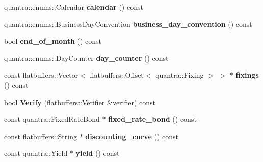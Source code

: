 \begin{DoxyCompactItemize}
quantra\+::enums\+::\+Calendar {\bfseries calendar} () const
\item 
\mbox{\label{structquantra_1_1FLATBUFFERS__FINAL__CLASS_acc1afb278b3cf7c9923940b4704456f9}} 
quantra\+::enums\+::\+Business\+Day\+Convention {\bfseries business\+\_\+day\+\_\+convention} () const
\item 
\mbox{\label{structquantra_1_1FLATBUFFERS__FINAL__CLASS_abdb9fb60303f28fc766fc1ab7c9555d8}} 
bool {\bfseries end\+\_\+of\+\_\+month} () const
\item 
\mbox{\label{structquantra_1_1FLATBUFFERS__FINAL__CLASS_a955b9a33f908db3b82dea98242bc214e}} 
quantra\+::enums\+::\+Day\+Counter {\bfseries day\+\_\+counter} () const
\item 
\mbox{\label{structquantra_1_1FLATBUFFERS__FINAL__CLASS_ac0992a882fdf0e3cc1274853d9350dae}} 
const flatbuffers\+::\+Vector$<$ flatbuffers\+::\+Offset$<$ quantra\+::\+Fixing $>$ $>$ $\ast$ {\bfseries fixings} () const
\item 
\mbox{\label{structquantra_1_1FLATBUFFERS__FINAL__CLASS_aed693ee5a45b5f53af7411f9cab6793a}} 
bool {\bfseries Verify} (flatbuffers\+::\+Verifier \&verifier) const
\item 
\mbox{\label{structquantra_1_1FLATBUFFERS__FINAL__CLASS_a2c68c02ac4d96cdf9b7e24928f4702f1}} 
const quantra\+::\+Fixed\+Rate\+Bond $\ast$ {\bfseries fixed\+\_\+rate\+\_\+bond} () const
\item 
\mbox{\label{structquantra_1_1FLATBUFFERS__FINAL__CLASS_a81f3cfb641540405607a0804e95e0a93}} 
const flatbuffers\+::\+String $\ast$ {\bfseries discounting\+\_\+curve} () const
\item 
\mbox{\label{structquantra_1_1FLATBUFFERS__FINAL__CLASS_adda837c430b8e761e469d0f6c244d902}} 
const quantra\+::\+Yield $\ast$ {\bfseries yield} () const
\item 
\mbox{\label{structquantra_1_1FLATBUFFERS__FINAL__CLASS_aed693ee5a45b5f53af7411f9cab6793a}} 

\end{DoxyCompactItemize}
